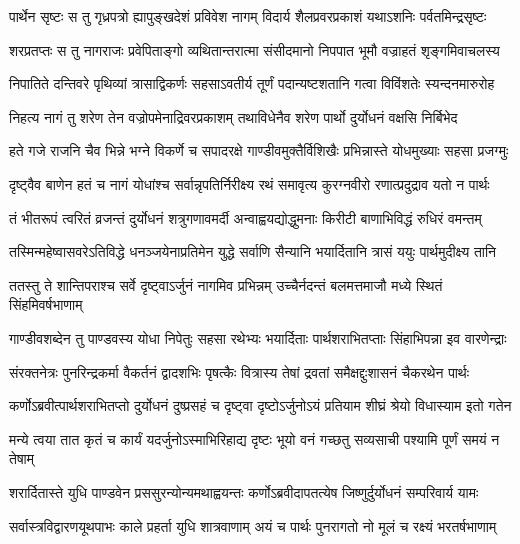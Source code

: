 \twolineshloka
{पार्थेन सृष्टः स तु गृध्रपत्रो ह्यापुङ्खदेशं प्रविवेश नागम्}
{विदार्य शैलप्रवरप्रकाशं यथाऽशनिः पर्वतमिन्द्रसृष्टः}


\twolineshloka
{शरप्रतप्तः स तु नागराजः प्रवेपिताङ्गो व्यथितान्तरात्मा}
{संसीदमानो निपपात भूमौ वज्राहतं शृङ्गमिवाचलस्य}


\twolineshloka
{निपातिते दन्तिवरे पृथिव्यां त्रासाद्विकर्णः सहसाऽवतीर्य}
{तूर्णं पदान्यष्टशतानि गत्वा विविंशतेः स्यन्दनमारुरोह}


\twolineshloka
{निहत्य नागं तु शरेण तेन वज्रोपमेनाद्रिवरप्रकाशम्}
{तथाविधेनैव शरेण पार्थो दुर्योधनं वक्षसि निर्बिभेद}


\twolineshloka
{हते गजे राजनि चैव भिन्ने भग्ने विकर्णे च सपादरक्षे}
{गाण्डीवमुक्तैर्विशिखैः प्रभिन्नास्ते योधमुख्याः सहसा प्रजग्मुः}


\twolineshloka
{दृष्ट्वैव बाणेन हतं च नागं योधांश्च सर्वान्नृपतिर्निरीक्ष्य}
{रथं समावृत्य कुरग्नवीरो रणात्प्रदुद्राव यतो न पार्थः}


\twolineshloka
{तं भीतरूपं त्वरितं व्रजन्तं दुर्योधनं शत्रुगणावमर्दी}
{अन्वाह्वयद्योद्धुमनाः किरीटी बाणाभिविद्धं रुधिरं वमन्तम्}


\twolineshloka
{तस्मिन्महेष्वासवरेऽतिविद्धे धनञ्जयेनाप्रतिमेन युद्धे}
{सर्वाणि सैन्यानि भयार्दितानि त्रासं ययुः पार्थमुदीक्ष्य तानि}


\twolineshloka
{ततस्तु ते शान्तिपराश्च सर्वे दृष्ट्वाऽर्जुनं नागमिव प्रभिन्नम्}
{उच्चैर्नदन्तं बलमत्तमाजौ मध्ये स्थितं सिंहमिवर्षभाणाम्}


\twolineshloka
{गाण्डीवशब्देन तु पाण्डवस्य योधा निपेतुः सहसा रथेभ्यः}
{भयार्दिताः पार्थशराभितप्ताः सिंहाभिपन्ना इव वारणेन्द्राः}


\twolineshloka
{संरक्तनेत्रः पुनरिन्द्रकर्मा वैकर्तनं द्वादशभिः पृषत्कैः}
{वित्रास्य तेषां द्रवतां समैक्षद्दुःशासनं चैकरथेन पार्थः}


\twolineshloka
{कर्णोऽब्रवीत्पार्थशराभितप्तो दुर्योधनं दुष्प्रसहं च दृष्ट्वा}
{दृष्टोऽर्जुनोऽयं प्रतियाम शीघ्रं श्रेयो विधास्याम इतो गतेन}


\twolineshloka
{मन्ये त्वया तात कृतं च कार्यं यदर्जुनोऽस्माभिरिहाद्य दृष्टः}
{भूयो वनं गच्छतु सव्यसाची पश्यामि पूर्णं समयं न तेषाम्}



\twolineshloka
{शरार्दितास्ते युधि पाण्डवेन प्रससुरन्योन्यमथाह्वयन्तः}
{कर्णोऽब्रवीदापतत्येष जिष्णुर्दुर्योधनं सम्परिवार्य यामः}


\twolineshloka
{सर्वास्त्रविद्वारणयूथपाभः काले प्रहर्ता युधि शात्रवाणाम्}
{अयं च पार्थः पुनरागतो नो मूलं च रक्ष्यं भरतर्षभाणाम्}



